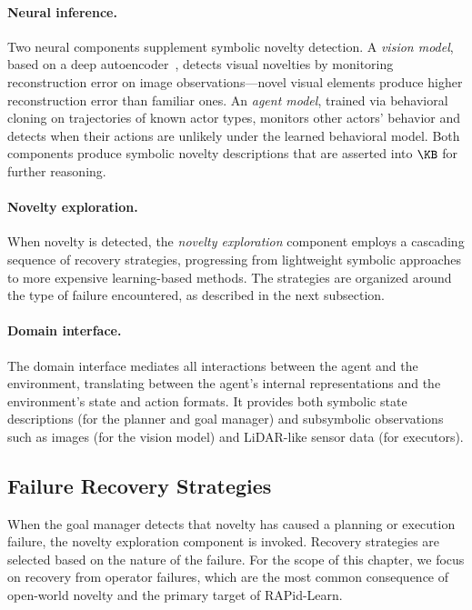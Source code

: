 \paragraph{Neural inference.} Two neural components supplement symbolic novelty detection. A \emph{vision model}, based on a deep autoencoder~\citep{abati2019autoregression}, detects visual novelties by monitoring reconstruction error on image observations---novel visual elements produce higher reconstruction error than familiar ones. An \emph{agent model}, trained via behavioral cloning on trajectories of known actor types, monitors other actors' behavior and detects when their actions are unlikely under the learned behavioral model. Both components produce symbolic novelty descriptions that are asserted into $\KB$ for further reasoning.

\paragraph{Novelty exploration.} When novelty is detected, the \emph{novelty exploration} component employs a cascading sequence of recovery strategies, progressing from lightweight symbolic approaches to more expensive learning-based methods. The strategies are organized around the type of failure encountered, as described in the next subsection.

\paragraph{Domain interface.} The domain interface mediates all interactions between the agent and the environment, translating between the agent's internal representations and the environment's state and action formats. It provides both symbolic state descriptions (for the planner and goal manager) and subsymbolic observations such as images (for the vision model) and LiDAR-like sensor data (for executors).


\subsection{Failure Recovery Strategies}
\label{sec:failure_recovery}

When the goal manager detects that novelty has caused a planning or execution failure, the novelty exploration component is invoked. Recovery strategies are selected based on the nature of the failure. For the scope of this chapter, we focus on recovery from operator failures, which are the most common consequence of open-world novelty and the primary target of RAPid-Learn.

